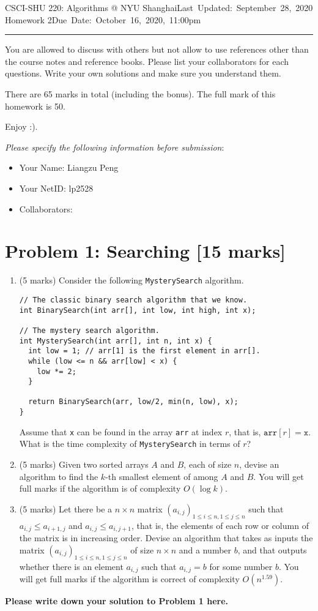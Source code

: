 \documentclass[11pt,twoside]{article}
\makeatletter
\newcommand{\homework}[1]{
   \pagestyle{myheadings}
   \thispagestyle{plain}
   \newpage
   \setcounter{page}{1}
   \noindent
   \classname \hfill \mbox{\updatedday} \\
   \instname \hfill \mbox{\duedate}
   \rule{6.5in}{0.5mm}
   \vspace*{-0.1 in}
}
\newcommand{\problem}[1]{\section*{Problem #1}}
\def\classname{CSCI-SHU 220: Algorithms @ NYU Shanghai}
\def\updatedday{Last Updated: September 28, 2020}
\def\duedate{Due Date: October 16, 2020, 11:00pm}
\newenvironment{solution}{{\par\noindent\it Solution.}}{}
\def\instname{Homework 2}
\makeatother
\begin{document}
\homework{2}

You are allowed to discuss with others but not allow to use references other than the course notes and reference books. Please list your collaborators for each questions. Write your own solutions and make sure you understand them. 

There are 65 marks in total (including the bonus). The full mark of this homework is 50.  

Enjoy :). 

\textit{Please specify the following information before submission}:
\begin{itemize}
    \item Your Name: Liangzu Peng%
    \item Your NetID: lp2528%
    \item Collaborators: %
\end{itemize}


\problem{1: Searching [15 marks]}
\begin{enumerate}
    \item (5 marks) Consider the following \texttt{MysterySearch} algorithm.
\begin{lstlisting}
// The classic binary search algorithm that we know.
int BinarySearch(int arr[], int low, int high, int x); 

// The mystery search algorithm.
int MysterySearch(int arr[], int n, int x) {
  int low = 1; // arr[1] is the first element in arr[].
  while (low <= n && arr[low] < x) {
    low *= 2;
  }
  
  return BinarySearch(arr, low/2, min(n, low), x);
}
\end{lstlisting}
Assume that \texttt{x} can be found in the array \texttt{arr} at index $r$, that is, $\texttt{arr}[r]=\texttt{x}$. What is the time complexity of \texttt{MysterySearch} in terms of $r$?
\item (5 marks) Given two sorted arrays $A$ and $B$, each of size $n$, devise an algorithm to find the $k$-th smallest element of among $A$ and $B$. You will get full marks if the algorithm is of complexity $O(\log k)$.
\item (5 marks) Let there be a $n\times n$ matrix $(a_{i,j})_{1\leq i\leq n, 1\leq j\leq n}$ such that $a_{i,j}\leq a_{i+1,j}$ and $a_{i,j}\leq a_{i,j+1}$, that is, the elements of each row or column of the matrix is in increasing order. Devise an algorithm that takes as inputs the matrix $(a_{i,j})_{1\leq i\leq n, 1\leq j\leq n}$ of size $n\times n$ and a number $b$, and that outputs whether there is an element $a_{i,j}$ such that $a_{i,j}=b$ for some number $b$. You will get full marks if the algorithm is correct of complexity $O(n^{1.59})$.
\end{enumerate}
\begin{solution}
\textbf{Please write down your solution to Problem 1 here.}
\end{solution}
\end{document}
